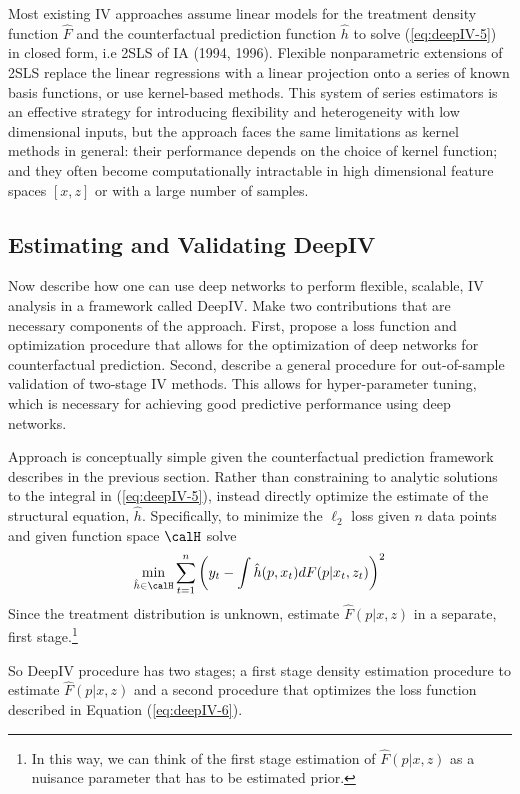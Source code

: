 Most existing IV approaches assume linear models for the treatment density function $\hat{F}$ and the counterfactual prediction function $\hat{h}$ to solve (\ref{eq:deepIV-5}) in closed form, i.e 2SLS of IA (1994, 1996).  Flexible nonparametric extensions of 2SLS replace the linear regressions with a linear projection onto a series of known basis functions, or use kernel-based methods. This system of series estimators is an effective strategy for introducing flexibility and heterogeneity with low dimensional inputs, but the approach faces the same limitations as kernel methods in general: their performance depends on the choice of kernel function; and they often become computationally intractable in high dimensional feature spaces $[x,z]$ or with a large number of samples.

\subsection{Estimating and Validating DeepIV}

Now describe how one can use deep networks to perform flexible, scalable, IV analysis in a framework called DeepIV. Make two contributions that are necessary components of the approach. First, propose a loss function and optimization procedure that allows for the optimization of deep networks for counterfactual prediction. Second, describe a general procedure for out-of-sample validation of two-stage IV methods. This allows for hyper-parameter tuning, which is necessary for achieving good predictive performance using deep networks. 

Approach is conceptually simple given the counterfactual prediction framework describes in the previous section. Rather than constraining to analytic solutions to the integral in (\ref{eq:deepIV-5}), instead directly optimize the estimate of the structural equation, $\hat{h}$. Specifically, to minimize the $\ell_2$ loss given $n$ data points and given function space $\calH$ solve 
\begin{equation}
	\label{eq:deepIV-6}
	\min_{\hat{h}\in \calH} \sum_{t=1}^n\left(y_t - \int \hat{h}(p,x_t)dF(p|x_t, z_t)\right)^2
\end{equation}
Since the treatment distribution is unknown, estimate $\hat{F}(p|x,z)$ in a separate, first stage.\footnote{In this way, we can think of the first stage estimation of $\hat{F}(p|x,z)$ as a nuisance parameter that has to be estimated prior.}

So DeepIV procedure has two stages; a first stage density estimation procedure to estimate $\hat{F}(p|x,z)$ and a second procedure that optimizes the loss function described in Equation (\ref{eq:deepIV-6}).

